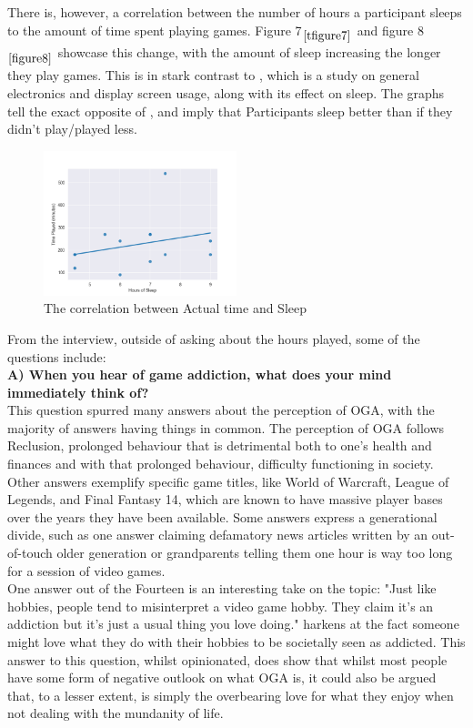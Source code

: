 \documentclass[conference]{IEEEtran}
\begin{document}
There is, however, a correlation between the number of hours a participant sleeps to the amount of time spent playing games. Figure 7$_{\ref{tfigure7}}$ and figure 8$_{\ref{figure8}}$ showcase this change, with the amount of sleep increasing the longer they play games. This is in stark contrast to \cite{Yamazaki2022}, which is a study on general electronics and display screen usage, along with its effect on sleep. The graphs tell the exact opposite of \cite{Yamazaki2022}, and imply that Participants sleep better than if they didn't play/played less.


\begin{figure}[H]
\includegraphics[width = 0.5\textwidth]{Graph3}
\caption{The correlation between Actual time and Sleep}
\label{tab:figure8}
\end{figure}


From the interview, outside of asking about the hours played, some of the questions include:\\

 \textbf{A) When you hear of game addiction, what does your mind immediately think of?}\\

This question spurred many answers about the perception of OGA, with the majority of answers having things in common. The perception of OGA follows Reclusion, prolonged behaviour that is detrimental both to one's health and finances and with that prolonged behaviour, difficulty functioning in society. Other answers exemplify specific game titles, like World of Warcraft, League of Legends, and Final Fantasy 14, which are known to have massive player bases over the years they have been available. Some answers express a generational divide, such as one answer claiming defamatory news articles written by an out-of-touch older generation or grandparents telling them one hour is way too long for a session of video games.\\

One answer out of the Fourteen is an interesting take on the topic: "Just like hobbies, people tend to misinterpret a video game hobby. They claim it's an addiction but it's just a usual thing you love doing." harkens at the fact someone might love what they do with their hobbies to be societally seen as addicted. This answer to this question, whilst opinionated, does show that whilst most people have some form of negative outlook on what OGA is, it could also be argued that, to a lesser extent, is simply the overbearing love for what they enjoy when not dealing with the mundanity of life.\\
\end{document}
